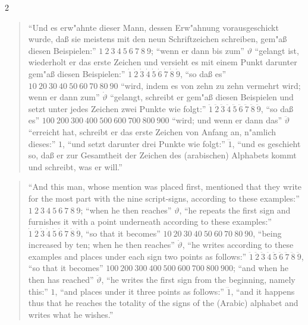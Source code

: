 \documentclass[10pt,a4paper]{article}
\renewcommand{\switchcolumn}{\syncronize\nointerlineskip\columnbreak}
\newcommand{\enquote}[1]{``#1''}
\begin{document}
\begin{paracol}{2}
\begin{quote}
\enquote{Und es erw"ahnte dieser Mann, dessen Erw"ahnung vorausgeschickt wurde, da\ss{} sie meistens mit den neun Schriftzeichen schreiben, gem"a\ss{} diesen Beispielen:} $1\ 2\ 3\ 4\ 5\ 6\ 7\ 8\ 9$; \enquote{wenn er dann bis zum} $\vartheta$ \enquote{gelangt ist, wiederholt er das erste Zeichen und versieht es mit einem Punkt darunter gem"a\ss{} diesen Beispielen:} $\dot{1}\ \dot{2}\ \dot{3}\ \dot{4}\ \dot{5}\ \dot{6}\ \dot{7}\ \dot{8}\ \dot{9}$, \enquote{so da\ss{} es} $10\ 20\ 30\ 40\ 50\ 60\ 70\ 80\ 90$ \enquote{wird, indem es von zehn zu zehn vermehrt wird; wenn er dann zum} $\dot{\vartheta}$ \enquote{gelangt, schreibt er gem"a\ss{} diesen Beispielen und setzt unter jedes Zeichen zwei Punkte wie folgt:} $\ddot{1}\ \ddot{2}\ \ddot{3}\ \ddot{4}\ \ddot{5}\ \ddot{6}\ \ddot{7}\ \ddot{8}\ \ddot{9}$, \enquote{so da\ss{} es} $100\ 200\ 300\ 400\ 500\ 600\ 700\ 800\ 900$ \enquote{wird; und wenn er dann das} $\ddot{\vartheta}$ \enquote{erreicht hat, schreibt er das erste Zeichen von Anfang an, n"amlich dieses:} $1$, \enquote{und setzt darunter drei Punkte wie folgt:} $\dddot{1}$, \enquote{und es geschieht so, da\ss{} er zur Gesamtheit der Zeichen des (arabischen) Alphabets kommt und schreibt, was er will.}
\end{quote}
\switchcolumn
\begin{quote}
``And this man, whose mention was placed first, mentioned that they write for the most part with the nine script-signs, according to these examples:'' $1\ 2\ 3\ 4\ 5\ 6\ 7\ 8\ 9$; ``when he then reaches'' $\vartheta$, ``he repeats the first sign and furnishes it with a point underneath according to these examples:'' $\dot{1}\ \dot{2}\ \dot{3}\ \dot{4}\ \dot{5}\ \dot{6}\ \dot{7}\ \dot{8}\ \dot{9}$, ``so that it becomes'' $10\ 20\ 30\ 40\ 50\ 60\ 70\ 80\ 90$, ``being increased by ten; when he then reaches'' $\dot{\vartheta}$, ``he writes according to these examples and places under each sign two points as follows:'' $\ddot{1}\ \ddot{2}\ \ddot{3}\ \ddot{4}\ \ddot{5}\ \ddot{6}\ \ddot{7}\ \ddot{8}\ \ddot{9}$, ``so that it becomes'' $100\ 200\ 300\ 400\ 500\ 600\ 700\ 800\ 900$; ``and when he then has reached'' $\ddot{\vartheta}$, ``he writes the first sign from the beginning, namely this:'' $1$, ``and places under it three points as follows:'' $\dddot{1}$, ``and it happens thus that he reaches the totality of the signs of the (Arabic) alphabet and writes what he wishes.''
\end{quote}
\end{paracol}
\end{document}
